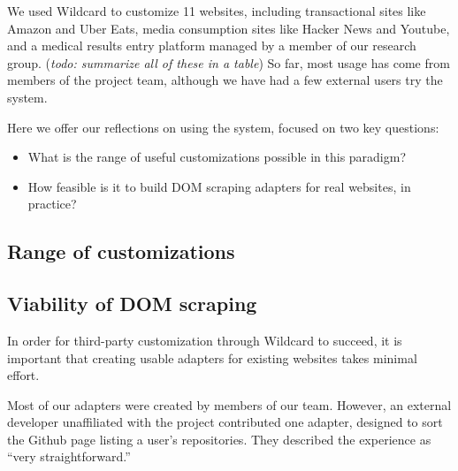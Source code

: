 \documentclass[sigplan,10pt,anonymous,review]{acmart}
\providecommand{\tightlist}{%
  \setlength{\itemsep}{0pt}\setlength{\parskip}{0pt}}
\begin{document}
We used Wildcard to customize 11 websites, including transactional sites
like Amazon and Uber Eats, media consumption sites like Hacker News and
Youtube, and a medical results entry platform managed by a member of our
research group. (\emph{todo: summarize all of these in a table}) So far,
most usage has come from members of the project team, although we have
had a few external users try the system.

Here we offer our reflections on using the system, focused on two key
questions:

\begin{itemize}
\tightlist
\item
  What is the range of useful customizations possible in this paradigm?
\item
  How feasible is it to build DOM scraping adapters for real websites,
  in practice?
\end{itemize}

\hypertarget{range-of-customizations}{%
\subsection{Range of customizations}\label{range-of-customizations}}

\hypertarget{viability-of-dom-scraping}{%
\subsection{Viability of DOM scraping}\label{viability-of-dom-scraping}}

In order for third-party customization through Wildcard to succeed, it
is important that creating usable adapters for existing websites takes
minimal effort.

Most of our adapters were created by members of our team. However, an
external developer unaffiliated with the project contributed one
adapter, designed to sort the Github page listing a user's repositories.
They described the experience as ``very straightforward.''
\end{document}
